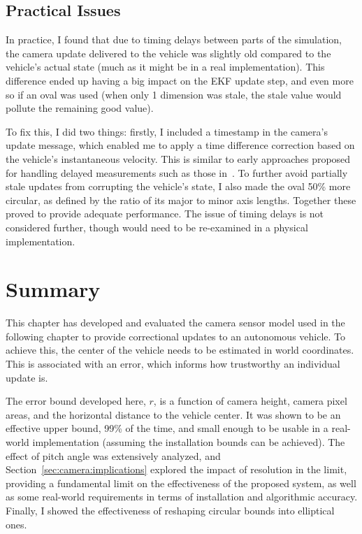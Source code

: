 \documentclass[a4paper,12pt,twoside,openright]{report}
\begin{document}
\subsection{Practical Issues}
In practice, I found that due to timing delays between parts of the simulation,
the camera update delivered to the vehicle was slightly old compared to the
vehicle's actual state (much as it might be in a real implementation). This
difference ended up having a big impact on the EKF update step, and even
more so if an oval was used (when only 1 dimension was stale, the stale
value would pollute the remaining good value).

To fix this, I did two things: firstly, I included a timestamp in the 
camera's update message, which enabled me to apply a time difference
correction based on the vehicle's instantaneous velocity. This is 
similar to early approaches proposed for handling delayed measurements
such as those in~\cite{larsen1998incorporation}\cite{tessier2006real}.
To further avoid partially stale updates from corrupting the vehicle's state,
I also made the oval 50\% more circular, as defined by the ratio
of its major to minor axis lengths. Together these proved to 
provide adequate performance. The issue of timing delays is not considered 
further, though would need to be re-examined in a physical implementation.
 
\section{Summary}

This chapter has developed and evaluated the camera sensor model
used in the following chapter to provide correctional updates
to an autonomous vehicle. To achieve this, the center
of the vehicle needs to be estimated in world coordinates. This
is associated with an error, which informs how trustworthy
an individual update is.

The error bound developed here, $r$, is a function of camera height,
camera pixel areas, and the horizontal distance to the vehicle center.
It was shown to be an effective upper bound, 99\% of the time, and
small enough to be usable in a real-world implementation (assuming
the installation bounds can be achieved). The effect of pitch angle
was extensively analyzed, and Section~\ref{sec:camera:implications}
explored the impact of resolution in the limit, providing a 
fundamental limit on the effectiveness of the proposed system,
as well as some real-world requirements in terms of
installation and algorithmic accuracy. Finally, I showed
the effectiveness of reshaping circular bounds into elliptical ones.
\end{document}
